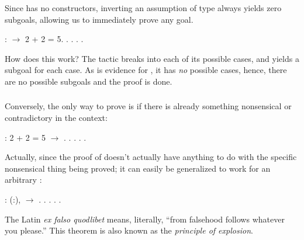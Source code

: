 \documentclass[12pt]{report}
\begin{document}
 Since  has no constructors, inverting an assumption
    of type  always yields zero subgoals, allowing us to
    immediately prove any goal. \begin{coqdoccode}
\coqdocemptyline
\coqdocnoindent
{}  :\coqdoceol
\coqdocindent{1.00em}
 \ensuremath{\rightarrow} 2 + 2 = 5.\coqdoceol
\coqdocnoindent
{}.\coqdoceol
\coqdocindent{1.00em}
 .\coqdoceol
\coqdocindent{1.00em}
 . .\coqdoceol
\coqdocemptyline
\end{coqdoccode}
How does this work? The  tactic breaks  into
    each of its possible cases, and yields a subgoal for each case.
    As  is evidence for , it has \textit{no} possible cases,
    hence, there are no possible subgoals and the proof is done. 

\subsubsection{ }

 Conversely, the only way to prove  is if there is already
    something nonsensical or contradictory in the context: \begin{coqdoccode}
\coqdocemptyline
\coqdocnoindent
{}  :\coqdoceol
\coqdocindent{1.00em}
2 + 2 = 5 \ensuremath{\rightarrow} .\coqdoceol
\coqdocnoindent
{}.\coqdoceol
\coqdocindent{1.00em}
 .\coqdoceol
\coqdocindent{1.00em}
 . .\coqdoceol
\coqdocemptyline
\end{coqdoccode}
Actually, since the proof of 
    doesn't actually have anything to do with the specific nonsensical
    thing being proved; it can easily be generalized to work for an
    arbitrary : \begin{coqdoccode}
\coqdocemptyline
\coqdocnoindent
{}  : \coqdockw{\ensuremath{\forall}} (:),\coqdoceol
\coqdocindent{1.00em}
 \ensuremath{\rightarrow} .\coqdoceol
\coqdocnoindent
{}.\coqdoceol
\coqdocindent{1.00em}
  .\coqdoceol
\coqdocindent{1.00em}
 . .\coqdoceol
\coqdocemptyline
\end{coqdoccode}
The Latin \textit{ex falso quodlibet} means, literally, ``from
    falsehood follows whatever you please.''  This theorem is also
    known as the \textit{principle of explosion}. \begin{coqdoccode}
\coqdocemptyline
\end{coqdoccode}
\end{document}
